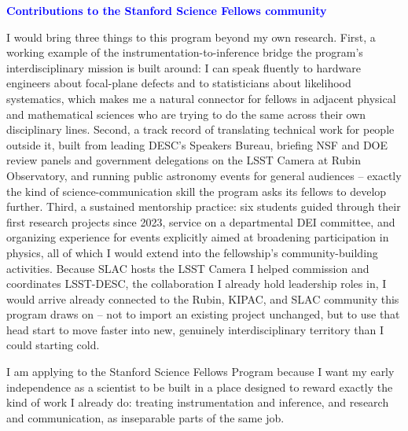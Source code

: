 \documentclass[11pt]{article}
\newcommand{\statement}[1]{\par\medskip
  \textcolor{blue}{\textbf{#1}}%
}
\begin{document}
\statement{Contributions to the Stanford Science Fellows community}
I would bring three things to this program beyond my own research. First, a working example of the instrumentation-to-inference bridge the program's interdisciplinary mission is built around: I can speak fluently to hardware engineers about focal-plane defects and to statisticians about likelihood systematics, which makes me a natural connector for fellows in adjacent physical and mathematical sciences who are trying to do the same across their own disciplinary lines. Second, a track record of translating technical work for people outside it, built from leading DESC's Speakers Bureau, briefing NSF and DOE review panels and government delegations on the LSST Camera at Rubin Observatory, and running public astronomy events for general audiences -- exactly the kind of science-communication skill the program asks its fellows to develop further. Third, a sustained mentorship practice: six students guided through their first research projects since 2023, service on a departmental DEI committee, and organizing experience for events explicitly aimed at broadening participation in physics, all of which I would extend into the fellowship's community-building activities. Because SLAC hosts the LSST Camera I helped commission and coordinates LSST-DESC, the collaboration I already hold leadership roles in, I would arrive already connected to the Rubin, KIPAC, and SLAC community this program draws on -- not to import an existing project unchanged, but to use that head start to move faster into new, genuinely interdisciplinary territory than I could starting cold.

I am applying to the Stanford Science Fellows Program because I want my early independence as a scientist to be built in a place designed to reward exactly the kind of work I already do: treating instrumentation and inference, and research and communication, as inseparable parts of the same job.
\end{document}
